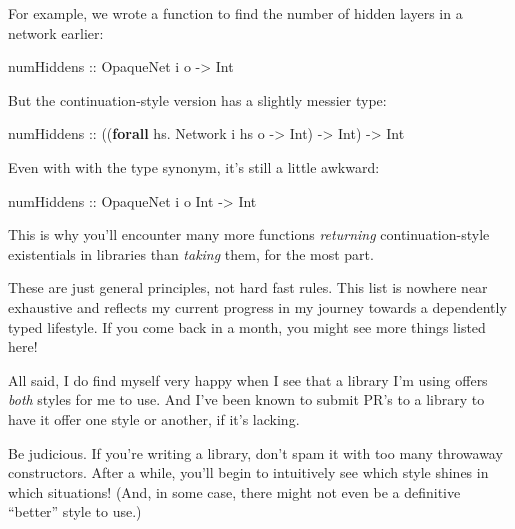 \documentclass[]{article}
\newenvironment{Shaded}{}{}
\newcommand{\DataTypeTok}[1]{\textcolor[rgb]{0.56,0.13,0.00}{#1}}
\newcommand{\KeywordTok}[1]{\textcolor[rgb]{0.00,0.44,0.13}{\textbf{#1}}}
\newcommand{\NormalTok}[1]{#1}
\newcommand{\OperatorTok}[1]{\textcolor[rgb]{0.40,0.40,0.40}{#1}}
\newcommand{\OtherTok}[1]{\textcolor[rgb]{0.00,0.44,0.13}{#1}}
\begin{document}
\begin{itemize}
  For example, we wrote a function to find the number of hidden layers in a
  network earlier:

\begin{Shaded}
\begin{Highlighting}[]
\OtherTok{numHiddens ::} \DataTypeTok{OpaqueNet}\NormalTok{ i o }\OtherTok{{-}\textgreater{}} \DataTypeTok{Int}
\end{Highlighting}
\end{Shaded}

  But the continuation-style version has a slightly messier type:

\begin{Shaded}
\begin{Highlighting}[]
\OtherTok{numHiddens\textquotesingle{} ::}\NormalTok{ ((}\KeywordTok{forall}\NormalTok{ hs}\OperatorTok{.} \DataTypeTok{Network}\NormalTok{ i hs o }\OtherTok{{-}\textgreater{}} \DataTypeTok{Int}\NormalTok{) }\OtherTok{{-}\textgreater{}} \DataTypeTok{Int}\NormalTok{)}
            \OtherTok{{-}\textgreater{}} \DataTypeTok{Int}
\end{Highlighting}
\end{Shaded}

  Even with with the type synonym, it's still a little awkward:

\begin{Shaded}
\begin{Highlighting}[]
\OtherTok{numHiddens\textquotesingle{} ::} \DataTypeTok{OpaqueNet\textquotesingle{}}\NormalTok{ i o }\DataTypeTok{Int} \OtherTok{{-}\textgreater{}} \DataTypeTok{Int}
\end{Highlighting}
\end{Shaded}

  This is why you'll encounter many more functions \emph{returning}
  continuation-style existentials in libraries than \emph{taking} them, for the
  most part.
\end{itemize}

These are just general principles, not hard fast rules. This list is nowhere
near exhaustive and reflects my current progress in my journey towards a
dependently typed lifestyle. If you come back in a month, you might see more
things listed here!

All said, I do find myself very happy when I see that a library I'm using offers
\emph{both} styles for me to use. And I've been known to submit PR's to a
library to have it offer one style or another, if it's lacking.

Be judicious. If you're writing a library, don't spam it with too many throwaway
constructors. After a while, you'll begin to intuitively see which style shines
in which situations! (And, in some case, there might not even be a definitive
``better'' style to use.)
\end{document}
